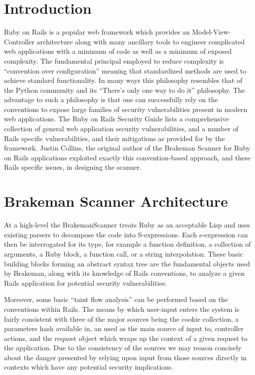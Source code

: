 \documentclass[conference]{IEEEtran}
\begin{document}
\section{Introduction}

Ruby on Rails is a popular web framework which provides an Model-View-Controller
architecture along with many ancillary tools to engineer complicated web
applications with a minimum of code as well as a minimum of exposed complexity.
The fundamental principal employed to reduce complexity is ``convention over
configuration'' meaning that standardized methods are used to achieve standard
functionality.  In many ways this philosophy resembles that of the Python
community and its ``There's only one way to do it'' philosophy.  The
advantage to such a philosophy is that one can successfully rely on the
conventions to expose large families of security vulnerabilities present in
modern web applications.  The Ruby on Rails Security Guide\cite{rails_security}
lists a comprehensive collection of general web application security
vulnerabilities, and a number of Rails specific vulnerabilities, and their
mitigations as provided for by the framework.  Justin Collins, the original
author of the Brakeman Scanner for Ruby on Rails applications exploited exactly
this convention-based approach, and these Rails specific issues, in designing
the scanner.

\section{Brakeman Scanner Architecture}

At a high-level the BrakemanScanner treats Ruby as an acceptable Lisp and uses
existing parsers to decompose the code into S-expressions\cite{sexp_for_rubyists}.  Each
s-expression can then be interrogated for its type, for example a function definition, a
collection of arguments, a Ruby block, a function call, or a string interpolation.  These
basic building blocks forming an abstract syntax tree are the fundamental objects used by
Brakeman, along with its knowledge of Rails conventions, to analyze a given Rails
application for potential security vulnerabilities.

Moreover, some basic ``taint flow analysis'' can be performed based on the conventions
within Rails.  The means by which user-input enters the system is fairly consistent with
three of the major sources being the cookie collection, a parameters hash available in, an
used as the main source of input to, controller actions, and the request object which
wraps up the context of a given request to the application.  Due to the consistency of the
sources we may reason concisely about the danger presented by relying upon input from
those sources directly in contexts which have any potential security implications.
\end{document}
